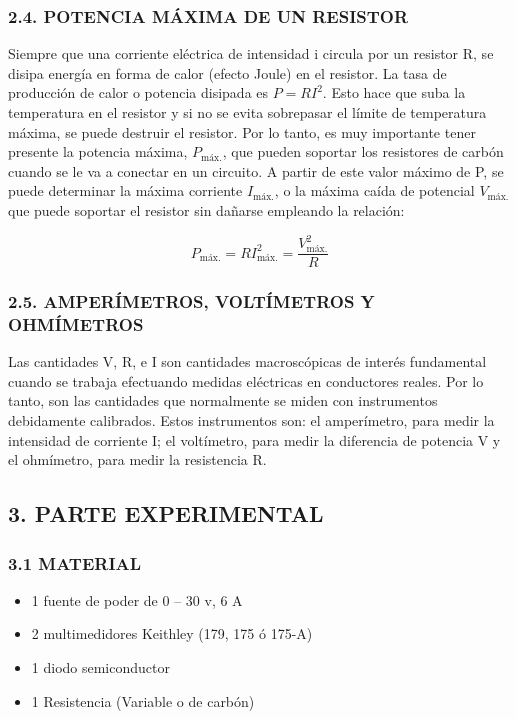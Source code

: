 \documentclass[12pt, a4paper]{article}
\begin{document}
\subsubsection*{2.4. POTENCIA MÁXIMA DE UN RESISTOR}
Siempre que una corriente eléctrica de intensidad i circula por un resistor R, se disipa energía en forma de calor 
(efecto Joule) en el resistor. La tasa de producción de calor o potencia disipada es $P=RI^2$. Esto hace que suba 
la temperatura en el resistor y si no se evita sobrepasar el límite de temperatura máxima, se puede destruir el 
resistor. Por lo tanto, es muy importante tener presente la potencia máxima, $P_{\text{máx.}}$, que pueden soportar  
los resistores de carbón cuando se le va a conectar en un circuito. A partir de este valor máximo de P, se puede 
determinar la máxima corriente $I_{\text{máx.}}$, o la máxima caída de potencial $V_{\text{máx.}}$ que puede soportar 
el resistor sin dañarse empleando la relación:

\begin{equation}
    P_{\text{máx.}} = RI_{\text{máx.}}^2 = \frac{V_{\text{máx.}}^2}{R}
\end{equation}

\subsubsection*{2.5. AMPERÍMETROS, VOLTÍMETROS Y OHMÍMETROS}
Las cantidades V, R, e I son cantidades macroscópicas de interés fundamental cuando se trabaja 
efectuando medidas eléctricas en conductores reales. Por lo tanto, son las cantidades que 
normalmente se miden con instrumentos debidamente calibrados. Estos instrumentos son: el 
amperímetro, para medir la intensidad de corriente I; el voltímetro, para medir la diferencia de 
potencia V y el ohmímetro, para medir la resistencia R.

\subsection*{3. PARTE EXPERIMENTAL}

\subsubsection*{3.1 MATERIAL}
\begin{itemize}
    \item 1 fuente de poder de 0 – 30 v, 6 A
    \item 2 multimedidores Keithley (179, 175 ó 175-A)
    \item 1 diodo semiconductor
    \item 1 Resistencia (Variable o de carbón)
\end{itemize}
\end{document}
